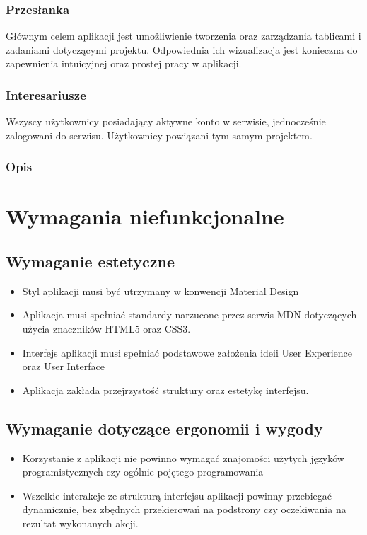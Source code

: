 \documentclass[eng,printmode]{mgr}
\begin{document}
\subsubsection{Przesłanka}
Głównym celem aplikacji jest umożliwienie tworzenia oraz zarządzania tablicami i zadaniami dotyczącymi projektu. Odpowiednia ich wizualizacja jest konieczna do zapewnienia intuicyjnej oraz prostej pracy w aplikacji.

\subsubsection{Interesariusze}
Wszyscy użytkownicy posiadający aktywne konto w serwisie, jednocześnie zalogowani do serwisu. Użytkownicy powiązani tym samym projektem.

\subsubsection{Opis}
\newpage

\section{Wymagania niefunkcjonalne}
\subsection{Wymaganie estetyczne}
\begin{itemize}
  \item Styl aplikacji musi być utrzymany w konwencji Material Design\cite{Material}
  \item Aplikacja musi spełniać standardy narzucone przez serwis MDN\cite {MDN_HTML}\cite {MDN_CSS} dotyczących użycia znaczników HTML5 oraz CSS3.
  \item Interfejs aplikacji musi spełniać podstawowe założenia ideii User Experience oraz User Interface\cite {Keyword_UserInterface}
  \item Aplikacja zakłada przejrzystość struktury oraz estetykę interfejsu.
\end{itemize} 

\subsection{Wymaganie dotyczące ergonomii i wygody}
\begin{itemize}
  \item Korzystanie z aplikacji nie powinno wymagać znajomości użytych języków programistycznych czy ogólnie pojętego programowania
  \item Wszelkie interakcje ze strukturą interfejsu aplikacji powinny przebiegać dynamicznie, bez zbędnych przekierowań na podstrony  czy oczekiwania na rezultat wykonanych akcji.
\end{itemize}
\end{document}
